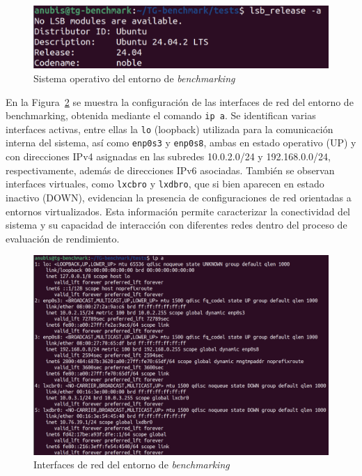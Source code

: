 \begin{figure}[H]
    \centering
    \includegraphics[width=\textwidth,height=0.85\textheight,keepaspectratio]{apendices/ENV-BENCH/OS.png}
    \caption{Sistema operativo del entorno de \textit{benchmarking}}\label{fig:OS-benchmarking}
\end{figure}
En la Figura~\ref{fig:INTERFACES-benchmarking} se muestra la configuración de las interfaces de red del entorno de benchmarking, obtenida mediante el comando \texttt{ip a}. Se identifican varias interfaces activas, entre ellas la \texttt{lo} (loopback) utilizada para la comunicación interna del sistema, así como \texttt{enp0s3} y \texttt{enp0s8}, ambas en estado operativo (UP) y con direcciones IPv4 asignadas en las subredes 10.0.2.0/24 y 192.168.0.0/24, respectivamente, además de direcciones IPv6 asociadas. También se observan interfaces virtuales, como \texttt{lxcbro} y \texttt{lxdbro}, que si bien aparecen en estado inactivo (DOWN), evidencian la presencia de configuraciones de red orientadas a entornos virtualizados. Esta información permite caracterizar la conectividad del sistema y su capacidad de interacción con diferentes redes dentro del proceso de evaluación de rendimiento.
\begin{figure}[H]
    \centering
    \includegraphics[width=\textwidth,height=0.85\textheight,keepaspectratio]{apendices/ENV-BENCH/interfaces.png}
    \caption{Interfaces de red del entorno de \textit{benchmarking}}\label{fig:INTERFACES-benchmarking}
\end{figure}

